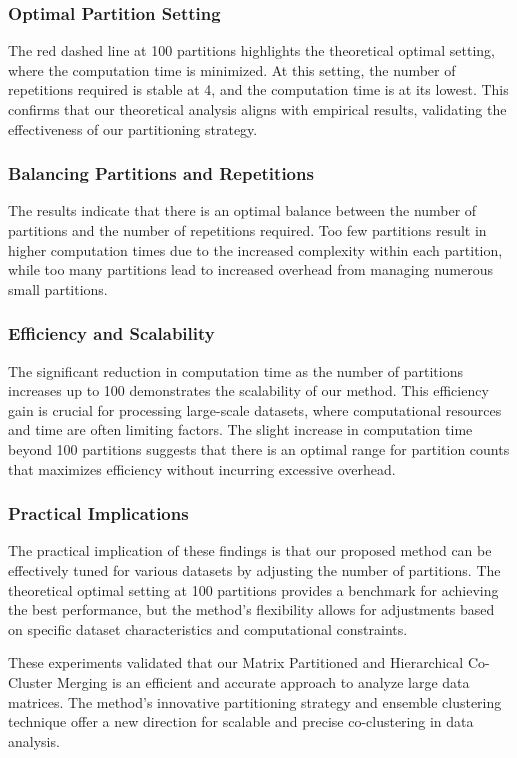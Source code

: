 \documentclass[journal]{IEEEtran}
\begin{document}
\subsubsection{Optimal Partition Setting}
The red dashed line at 100 partitions highlights the theoretical optimal setting, where the computation time is minimized. At this setting, the number of repetitions required is stable at 4, and the computation time is at its lowest. This confirms that our theoretical analysis aligns with empirical results, validating the effectiveness of our partitioning strategy.

\subsubsection{Balancing Partitions and Repetitions}
The results indicate that there is an optimal balance between the number of partitions and the number of repetitions required. Too few partitions result in higher computation times due to the increased complexity within each partition, while too many partitions lead to increased overhead from managing numerous small partitions.

\subsubsection{Efficiency and Scalability}
The significant reduction in computation time as the number of partitions increases up to 100 demonstrates the scalability of our method. This efficiency gain is crucial for processing large-scale datasets, where computational resources and time are often limiting factors. The slight increase in computation time beyond 100 partitions suggests that there is an optimal range for partition counts that maximizes efficiency without incurring excessive overhead.

\subsubsection{Practical Implications}
The practical implication of these findings is that our proposed method can be effectively tuned for various datasets by adjusting the number of partitions. The theoretical optimal setting at 100 partitions provides a benchmark for achieving the best performance, but the method's flexibility allows for adjustments based on specific dataset characteristics and computational constraints.

These experiments validated that our Matrix Partitioned and Hierarchical Co-Cluster Merging is an efficient and accurate approach to analyze large data matrices. The method's innovative partitioning strategy and ensemble clustering technique offer a new direction for scalable and precise co-clustering in data analysis.
\end{document}
